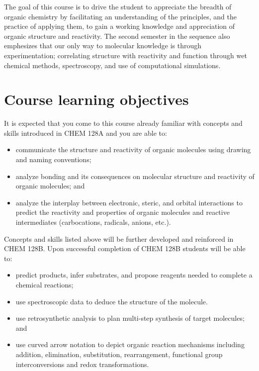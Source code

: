 The goal of this course is to drive the student to appreciate the
breadth of organic chemistry by facilitating an understanding of the
principles, and the practice of applying them, to gain a working
knowledge and appreciation of organic structure and reactivity. The
second semester in the sequence also emphesizes that our only way to
molecular knowledge is through experimentation; correlating structure
with reactivity and function through wet chemical methods, spectroscopy,
and use of computational simulations.

\hypertarget{course-learning-objectives}{%
\section{Course learning objectives}\label{course-learning-objectives}}

It is expected that you come to this course already familiar with
concepts and skills introduced in CHEM 128A and you are able to:

\begin{itemize}
\tightlist
\item
  communicate the structure and reactivity of organic molecules using
  drawing and naming conventions;
\item
  analyze bonding and its consequences on molecular structure and
  reactivity of organic molecules; and
\item
  analyze the interplay between electronic, steric, and orbital
  interactions to predict the reactivity and properties of organic
  molecules and reactive intermediates (carbocations, radicals, anions,
  etc.).
\end{itemize}

Concepts and skills listed above will be further developed and
reinforced in CHEM 128B. Upon successful completion of CHEM 128B
students will be able to:

\begin{itemize}
\tightlist
\item
  predict products, infer substrates, and propose reagents needed to
  complete a chemical reactions;
\item
  use spectroscopic data to deduce the structure of the molecule.
\item
  use retrosynthetic analysis to plan multi-step synthesis of target
  molecules; and
\item
  use curved arrow notation to depict organic reaction mechanisms
  including addition, elimination, substitution, rearrangement,
  functional group interconversions and redox transformations.
\end{itemize}

